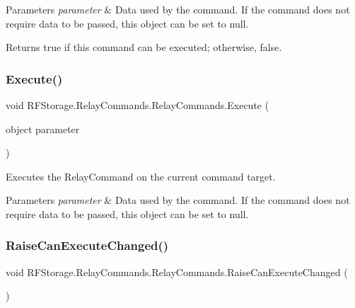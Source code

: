 \begin{DoxyParams}{Parameters}
{\em parameter} & Data used by the command. If the command does not require data to be passed, this object can be set to null. \\
\hline
\end{DoxyParams}
\begin{DoxyReturn}{Returns}
true if this command can be executed; otherwise, false.
\end{DoxyReturn}
\mbox{\label{class_r_f_storage_1_1_relay_commands_1_1_relay_commands_a6b61d7cc0250993b87aadc1d103829f0}} 
\subsubsection{\texorpdfstring{Execute()}{Execute()}}
{\footnotesize\ttfamily void R\+F\+Storage.\+Relay\+Commands.\+Relay\+Commands.\+Execute (\begin{DoxyParamCaption}\item[{object}]{parameter }\end{DoxyParamCaption})}



Executes the Relay\+Command on the current command target. 


\begin{DoxyParams}{Parameters}
{\em parameter} & Data used by the command. If the command does not require data to be passed, this object can be set to null. \\
\hline
\end{DoxyParams}
\mbox{\label{class_r_f_storage_1_1_relay_commands_1_1_relay_commands_a73137b1aab2a5338b3e707007519bfda}} 
\subsubsection{\texorpdfstring{RaiseCanExecuteChanged()}{RaiseCanExecuteChanged()}}
{\footnotesize\ttfamily void R\+F\+Storage.\+Relay\+Commands.\+Relay\+Commands.\+Raise\+Can\+Execute\+Changed (\begin{DoxyParamCaption}{ }\end{DoxyParamCaption})}



